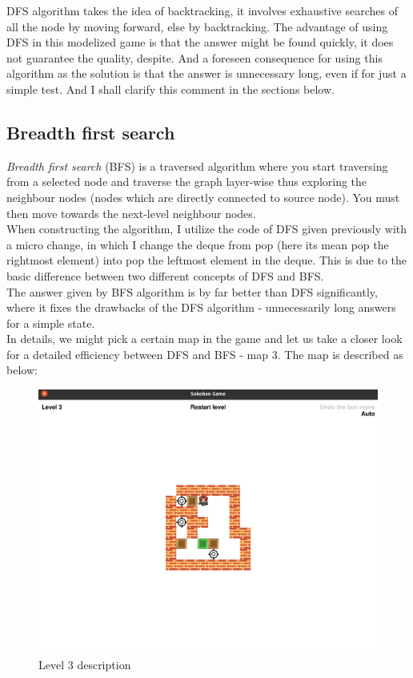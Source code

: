 \documentclass{article}
\begin{document}
DFS algorithm takes the idea of backtracking, it involves exhaustive searches of all the node by moving forward, else by backtracking. The advantage of using DFS in this modelized game is that the answer might be found quickly, it does not guarantee the quality, despite. And a foreseen consequence for using this algorithm as the solution is that the answer is unnecessary long, even if for just a simple test. And I shall clarify this comment in the sections below.

\subsection{Breadth first search}
\textit{Breadth first search} (BFS) is a traversed algorithm where you start traversing from a selected node and traverse the graph layer-wise thus exploring the neighbour nodes (nodes which are directly connected to source node). You must then move towards the next-level neighbour nodes.\\

When constructing the algorithm, I utilize the code of DFS given previously with a micro change, in which I change the deque from pop (here its mean pop the rightmost element) into pop the leftmost element in the deque. This is due to the basic difference between two different concepts of DFS and BFS.\\

The answer given by BFS algorithm is by far better than DFS significantly, where it fixes the drawbacks of the DFS algorithm - unnecessarily long answers for a simple state.\\

In details, we might pick a certain map in the game and let us take a closer look for a detailed efficiency between DFS and BFS - map 3.
The map is described as below:
\begin{figure}[h!]
  \centering
  \begin{minipage}[b]{0.4\textwidth}
    \includegraphics[width=\textwidth]{Level 3.png}
    \caption{Level 3 description}
  \end{minipage}
  \hfill
\end{figure}\\
\end{document}
